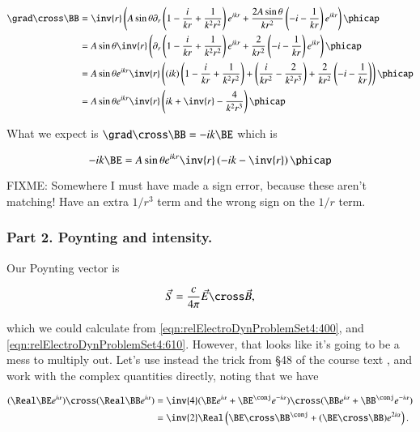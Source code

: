 \begin{align*}
\grad \cross \BB 
&=
\inv{r } \left(
 A\sin\theta 
\partial_r \left( 1 - \frac{i}{k r} + \frac{1}{k^2 r^2} \right) e^{i k r} 
+\frac{2 A \sin\theta}{k r^2} 
\left( -i - \frac{1}{k r} \right) e^{i k r} 
\right) \phicap \\
&=
A \sin\theta 
\inv{r } \left(
\partial_r \left( 1 - \frac{i}{k r} + \frac{1}{k^2 r^2} \right) e^{i k r} 
+\frac{2 }{k r^2} 
\left( -i - \frac{1}{k r} \right) e^{i k r} 
\right) \phicap \\
&=
A \sin\theta e^{i k r}
\inv{r } \left(
(ik)\left( 1 - \frac{i}{k r} + \frac{1}{k^2 r^2} \right) 
+\left( \frac{i}{k r^2} - \frac{2}{k^2 r^3} \right) 
+\frac{2 }{k r^2} 
\left( -i - \frac{1}{k r} \right) 
\right) \phicap \\
&=
A \sin\theta e^{i k r}
\inv{r } \left(
i k + \inv{r} - \frac{ 4 }{k^2 r^3}
\right) \phicap \\
\end{align*}

What we expect is $\grad \cross \BB = - i k \BE$ which is

\begin{equation}\label{eqn:relElectroDynProblemSet4:640}
- i k \BE =
A \sin\theta e^{i k r}
\inv{r } \left(
- i k - \inv{r}
\right) \phicap 
\end{equation}

FIXME: Somewhere I must have made a sign error, because these aren't matching!  Have an extra $1/r^3$ term and the wrong sign on the $1/r$ term.

\subsubsection{Part 2.  Poynting and intensity.}

Our Poynting vector is

\begin{equation}\label{eqn:relElectroDynProblemSet4:650}
\vec{S} = \frac{c}{4 \pi} \vec{E} \cross \vec{B},
\end{equation}

which we could calculate from \ref{eqn:relElectroDynProblemSet4:400}, and \ref{eqn:relElectroDynProblemSet4:610}.  However, that looks like it's going to be a mess to multiply out.  Let's use instead the trick from \S 48 of the course text \citep{landau1980classical}, and work with the complex quantities directly, noting that we have

\begin{align*}
(\Real \BE e^{i \alpha}) \cross (\Real \BB e^{i \alpha}) 
&= \inv{4} 
( \BE e^{i \alpha} + \BE^\conj e^{-i \alpha}) \cross ( \BB e^{i \alpha} + \BB^\conj e^{-i \alpha}) \\
&= \inv{2} \Real \left( \BE \cross \BB^\conj + (\BE \cross \BB) e^{2 i \alpha} \right).
\end{align*}

